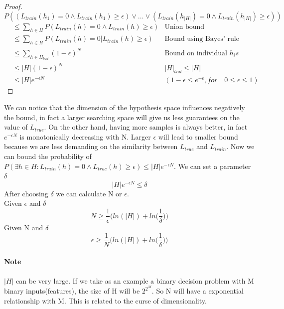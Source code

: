 \documentclass[main.tex]{subfiles}
\begin{document}
\newpage
\begin{proof}
$$P((L_{train}(h_1)=0 \land L_{train}(h_1) \geq \epsilon) \lor \dots \lor (L_{train}(h_{|H|})=0 \land L_{train}(h_{|H|}) \geq \epsilon))$$
\begin{align*}
    &\leq \sum_{h \in H} P(L_{train}(h)=0 \land L_{train}(h) \geq \epsilon) &\text{Union bound} \\
    &\leq \sum_{h \in H} P(L_{train}(h)=0 | L_{train}(h) \geq \epsilon) &\text{Bound using Bayes’ rule} \\
    &\leq \sum_{h \in H_{bad}} (1-\epsilon)^N &\text{Bound on individual }h_is \\
    &\leq |H|(1-\epsilon)^N & |H|_{bad}\leq|H| \\
    &\leq |H|e^{-\epsilon N} &(1-\epsilon \leq e^{-\epsilon},for \quad 0 \leq \epsilon \leq 1)
\end{align*}
\end{proof}
We can notice that the dimension of the hypothesis space influences negatively the bound, in fact a larger searching space will give us less guarantees on the value of $L_{true}$. On the other hand, having more samples is always better, in fact $e^{-\epsilon N}$ is monotonically decreasing with N. Larger $\epsilon$ will lead to smaller bound because we are less demanding on the similarity between $L_{true}$ and $L_{train}$.
Now we can bound the probability of $P(\exists h \in H: L_{train}(h)=0 \land L_{true}(h) \geq \epsilon) \leq |H|e^{−\epsilon N}$. We can set a parameter $\delta$
\begin{equation*}
    |H|e^{-\epsilon N} \leq \delta
\end{equation*}
After choosing $\delta$ we can calculate N or $\epsilon$.\\
Given $\epsilon$ and $\delta$
\begin{equation}
    N \geq \frac{1}{\epsilon} \bigg( ln(|H|) + ln \bigg( \frac{1}{\delta} \bigg) \bigg)
\end{equation}
Given N and $\delta$
\begin{equation}
    \epsilon \geq \frac{1}{N} \bigg( ln(|H|) + ln \bigg( \frac{1}{\delta} \bigg) \bigg)
\end{equation}
\paragraph{Note} $|H|$ can be very large. If we take as an example a binary decision problem with M binary inputs(features), the size of H will be $2^{2^M}$. So N will have a exponential relationship with M. This is related to the curse of dimensionality.
\end{document}
